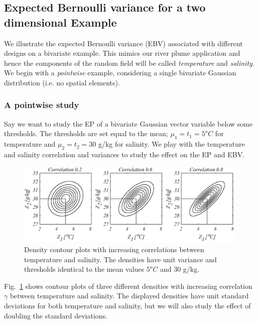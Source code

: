 \documentclass[aoas]{imsart}
\begin{document}
\subsection{Expected Bernoulli variance for a two dimensional Example}
\label{Sec:UnivarEx}

We illustrate the expected Bernoulli variance (EBV) associated with
different designs on a bivariate example. This mimics our river plume
application and hence the components of the random
field will be called \textit{temperature} and \textit{salinity}. We
begin with a \textit{pointwise} example, considering a single
bivariate Gaussian distribution (i.e. no spatial elements).

\subsubsection{A pointwise study}

Say we want to study the EP of a bivariate Gaussian
vector variable below some thresholds. The thresholds are set equal to the mean;
$\mu_1=t_1=5^o C$ for temperature and $\mu_2=t_2=30$ g/kg for
salinity. We play with the temperature and salinity correlation
and variances to study the effect on the EP and EBV.

\begin{figure}[!b] 
\centering
\includegraphics[width=0.99\textwidth]{Figures/illus_bivarNEW.eps}%
\caption{Density contour plots with increasing correlations between
  temperature and salinity. The densities have unit variance and
  thresholds identical to the mean values $5^o C$ and
  $30$ g/kg.}
\label{illus_bivarDens}
\end{figure}

Fig.~\ref{illus_bivarDens} shows contour plots of three different
densities with increasing correlation $\gamma$ between temperature and
salinity. The displayed densities have unit standard deviations for
both temperature and salinity, but we will also study the effect of
doubling the standard deviations.
\end{document}
